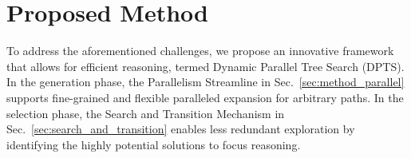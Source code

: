 \section{Proposed Method}
\label{sec:method}
To address the aforementioned challenges, we propose an innovative framework that allows for efficient reasoning, termed Dynamic Parallel Tree Search (DPTS). 
In the generation phase, the Parallelism Streamline in Sec.~\ref{sec:method_parallel} supports fine-grained and flexible paralleled expansion for arbitrary paths. 
In the selection phase, the Search and Transition Mechanism in Sec.~\ref{sec:search_and_transition} enables less redundant exploration by identifying the highly potential solutions to focus reasoning. 




    
    
